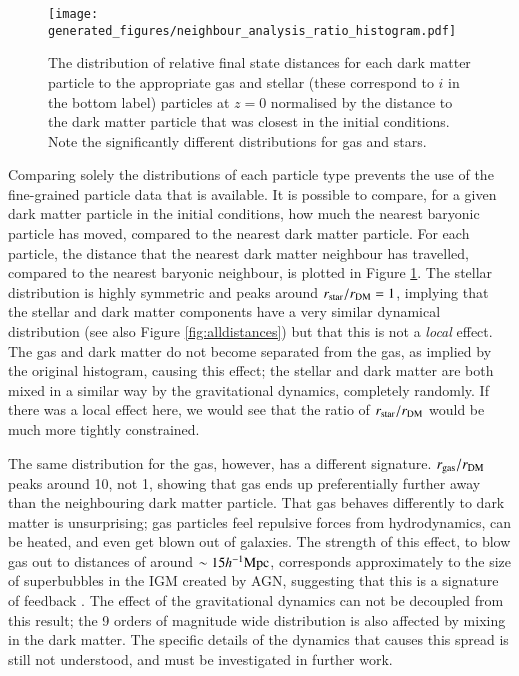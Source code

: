 \begin{figure} \centering
	\texttt{[image: generated\_figures/neighbour\_analysis\_ratio\_histogram.pdf]}
	\caption{The distribution of relative final state distances for each
	dark matter particle to the appropriate gas and stellar (these
	correspond to $i$ in the bottom label) particles at $z=0$ normalised by
	the distance to the dark matter particle that was closest in the
	initial conditions. Note the significantly different distributions for
	gas and stars.}
\label{fig:dmvsstarvsgas} \end{figure}

Comparing solely the distributions of each particle type prevents the use of
the fine-grained particle data that is available. It is possible to compare,
for a given dark matter particle in the initial conditions, how much the
nearest baryonic particle has moved, compared to the nearest dark matter
particle. For each particle, the distance that the nearest dark matter
neighbour has travelled, compared to the nearest baryonic neighbour, is plotted in
Figure \ref{fig:dmvsstarvsgas}. The stellar distribution is highly symmetric
and peaks around $r_{\rm star}/r_{\rm DM} = 1$, implying that the stellar and
dark matter components have a very similar dynamical distribution (see also
Figure \ref{fig:alldistances}) but that this is not a \emph{local} effect.
The gas and dark matter do not become separated from the gas, as implied by the
original histogram, causing this effect; the stellar and dark matter are both
mixed in a similar way by the gravitational dynamics, completely randomly. If
there was a local effect here, we would see that the ratio of
$r_{\rm star}/r_{\rm DM}$ would be much more tightly constrained.

The same distribution for the gas, however, has a different signature.
$r_{\rm gas}/r_{\rm DM}$ peaks around 10, not 1, showing that gas ends up
preferentially further away than the neighbouring dark matter particle. That
gas behaves differently to dark matter is unsurprising; gas particles feel
repulsive forces from hydrodynamics, can be heated, and even get blown out of
galaxies. The strength of this effect, to blow gas out to distances of around
$\sim15 h^{-1}{\rm Mpc}{}$, corresponds approximately to the size of superbubbles in the
IGM created by AGN, suggesting that this is a signature of feedback
\citep{dave2018}. The effect of the gravitational dynamics can not be
decoupled from this result; the 9 orders of magnitude wide distribution is
also affected by mixing in the dark matter. The specific details of the
dynamics that causes this spread is still not understood, and must be
investigated in further work.
